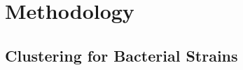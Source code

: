 \chapter{Methodology}\label{chap:methodology}
\section{Clustering for Bacterial Strains}\label{sec:clusteringbs}
\section{\krap{}}